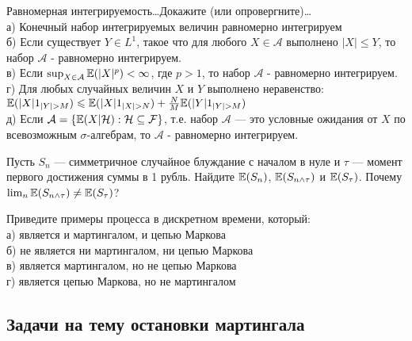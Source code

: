 \begin{problem}
 Равномерная интегрируемость\ldots Докажите (или опровергните)\ldots \\
а) Конечный набор интегрируемых величин равномерно
интегрируем \\
б) Если существует $Y\in L^{1}$, такое что для любого $X\in
\mathcal{A}$ выполнено $|X|\le Y$, то набор $\mathcal{A}$ -
равномерно интегрируем. \\
в) Если $\sup_{X\in \mathcal{A}}\mathbb{E}(|X|^{p})<\infty$, где $p>1$, то
набор $\mathcal{A}$ -
равномерно интегрируем. \\
г) Для любых случайных величин $X$ и $Y$ выполнено неравенство:
$\E(|X|1_{|Y|>M})\le \E(|X|1_{|X|>N})+\frac{N}{M}\E(|Y|1_{|Y|>M})$ \\
д) Если $\mathcal{A}=\{\mathbb{E}(X|\mathcal{H}):\mathcal{H}\subseteq
\mathcal{F}\}$, т.е. набор $\mathcal{A}$ — это условные ожидания
от $X$ по всевозможным $\sigma$-алгебрам, то $\mathcal{A}$ -
равномерно интегрируем.

\begin{sol}

\end{sol}
\end{problem}

\begin{problem}
Пусть $S_{n}$ — симметричное случайное блуждание с началом в
нуле и $\tau$ — момент первого достижения суммы в 1 рубль. Найдите
$\mathbb{E}(S_{n})$, $\mathbb{E}(S_{n\wedge \tau})$ и $\mathbb{E}(S_{\tau})$. Почему
$\lim_{n}
\mathbb{E}(S_{n\wedge \tau})\neq \mathbb{E}(S_{\tau})$?

\begin{sol}

\end{sol}
\end{problem}

\begin{problem}
Приведите примеры процесса в дискретном времени, который: \\
а) является и мартингалом, и цепью Маркова \\
б) не является ни мартингалом, ни цепью Маркова \\
в) является мартингалом, но не цепью Маркова \\
г) является цепью Маркова, но не мартингалом

\begin{sol}
\end{sol}
\end{problem}

\subsection{Задачи на тему остановки мартингала}

